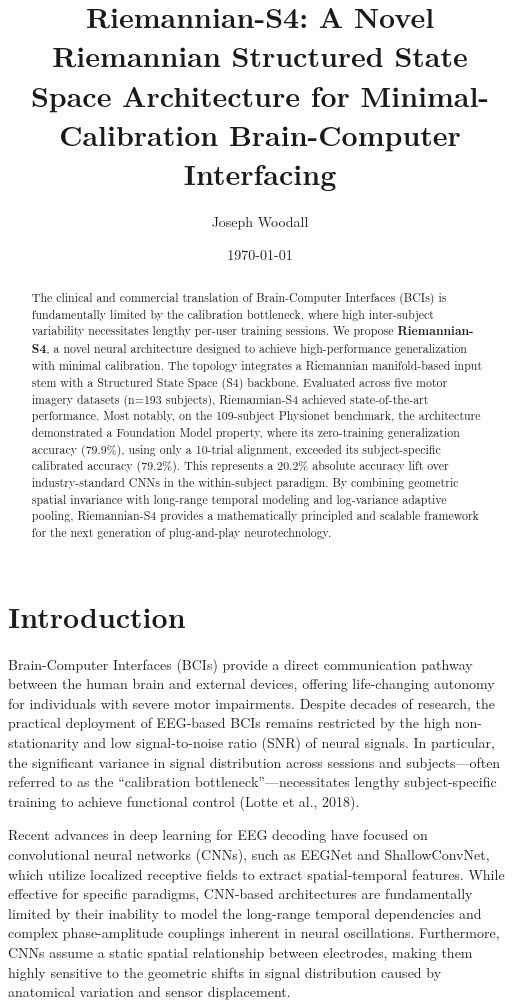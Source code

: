 \documentclass[11pt,a4paper]{article}
\title{\textbf{Riemannian-S4: A Novel Riemannian Structured State Space Architecture for Minimal-Calibration Brain-Computer Interfacing}}
\author[1]{Joseph Woodall}
\date{\today}
\begin{document}
\maketitle

\begin{abstract}
The clinical and commercial translation of Brain-Computer Interfaces (BCIs) is fundamentally limited by the calibration bottleneck, where high inter-subject variability necessitates lengthy per-user training sessions. We propose \textbf{Riemannian-S4}, a novel neural architecture designed to achieve high-performance generalization with minimal calibration. The topology integrates a Riemannian manifold-based input stem with a Structured State Space (S4) backbone. Evaluated across five motor imagery datasets (n=193 subjects), Riemannian-S4 achieved state-of-the-art performance. Most notably, on the 109-subject Physionet benchmark, the architecture demonstrated a Foundation Model property, where its zero-training generalization accuracy (79.9\%), using only a 10-trial alignment, exceeded its subject-specific calibrated accuracy (79.2\%). This represents a 20.2\% absolute accuracy lift over industry-standard CNNs in the within-subject paradigm. By combining geometric spatial invariance with long-range temporal modeling and log-variance adaptive pooling, Riemannian-S4 provides a mathematically principled and scalable framework for the next generation of plug-and-play neurotechnology.
\end{abstract}

\section{Introduction}
Brain-Computer Interfaces (BCIs) provide a direct communication pathway between the human brain and external devices, offering life-changing autonomy for individuals with severe motor impairments. Despite decades of research, the practical deployment of EEG-based BCIs remains restricted by the high non-stationarity and low signal-to-noise ratio (SNR) of neural signals. In particular, the significant variance in signal distribution across sessions and subjects---often referred to as the ``calibration bottleneck''---necessitates lengthy subject-specific training to achieve functional control (Lotte et al., 2018).

Recent advances in deep learning for EEG decoding have focused on convolutional neural networks (CNNs), such as EEGNet and ShallowConvNet, which utilize localized receptive fields to extract spatial-temporal features. While effective for specific paradigms, CNN-based architectures are fundamentally limited by their inability to model the long-range temporal dependencies and complex phase-amplitude couplings inherent in neural oscillations. Furthermore, CNNs assume a static spatial relationship between electrodes, making them highly sensitive to the geometric shifts in signal distribution caused by anatomical variation and sensor displacement.
\end{document}
